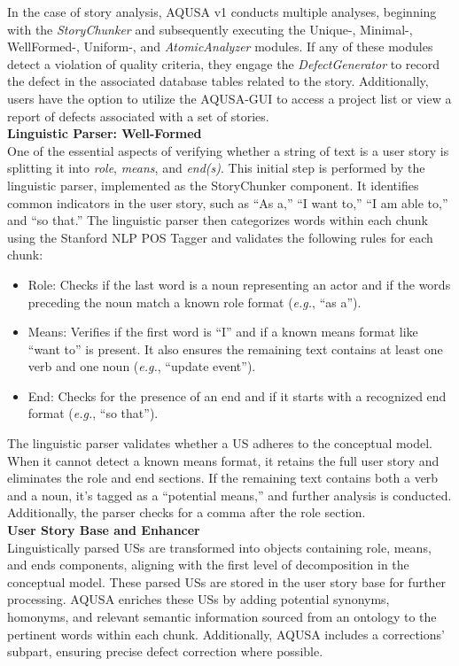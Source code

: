 In the case of story analysis, AQUSA v1 conducts multiple analyses, beginning with the \emph{StoryChunker} and subsequently executing the Unique-, Minimal-, WellFormed-, Uniform-, and \emph{AtomicAnalyzer} modules. If any of these modules detect a violation of quality criteria, they engage the \emph{DefectGenerator} to record the defect in the associated database tables related to the story. Additionally, users have the option to utilize the AQUSA-GUI to access a project list or view a report of defects associated with a set of stories. \\ 
\textbf{Linguistic Parser: Well-Formed}\\ 
One of the essential aspects of verifying whether a string of text is a user story is splitting it into \emph{role}, \emph{means}, and \emph{end(s)}. This initial step is performed by the linguistic parser, implemented as the StoryChunker component. It identifies common indicators in the user story, such as \enquote{As a,} \enquote{I want to,} \enquote{I am able to,} and \enquote{so that.} The linguistic parser then categorizes words within each chunk using the Stanford NLP POS Tagger and validates the following rules for each chunk:
\begin{itemize}
\item Role: Checks if the last word is a noun representing an actor and if the words preceding the noun match a known role format (\emph{e.g.}, \enquote{as a}).
\item Means: Verifies if the first word is \enquote{I} and if a known means format like \enquote{want to} is present. It also ensures the remaining text contains at least one verb and one noun (\emph{e.g.}, \enquote{update event}).
\item End: Checks for the presence of an end and if it starts with a recognized end format (\emph{e.g.}, \enquote{so that}).
\end{itemize}
The linguistic parser validates whether a US adheres to the conceptual model. When it cannot detect a known means format, it retains the full user story and eliminates the role and end sections. If the remaining text contains both a verb and a noun, it's tagged as a \enquote{potential means,} and further analysis is conducted. Additionally, the parser checks for a comma after the role section. \\ 
\textbf{User Story Base and Enhancer}\\ 
Linguistically parsed USs are transformed into objects containing role, means, and ends components, aligning with the first level of decomposition in the conceptual model. These parsed USs are stored in the user story base for further processing. AQUSA enriches these USs by adding potential synonyms, homonyms, and relevant semantic information sourced from an ontology to the pertinent words within each chunk. Additionally, AQUSA includes a corrections' subpart, ensuring precise defect correction where possible. \\ 
